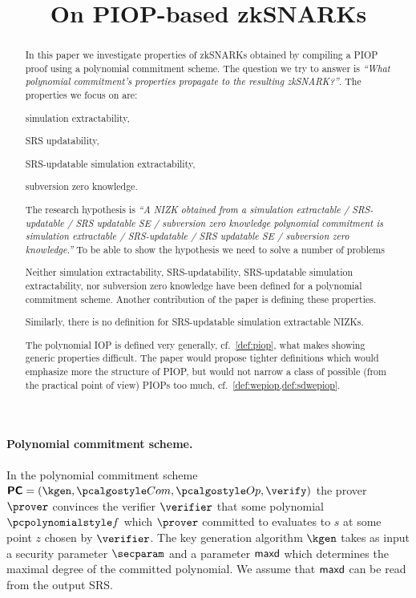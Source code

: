 \documentclass[runningheads,11pt]{llncs}
\title{On PIOP-based zkSNARKs}
\author{}
\institute{}
\newcommand{\say}[1]{\emph{``#1''}}
\begin{document}
 \sloppy \maketitle

\begin{abstract}
  In this paper we investigate properties of zkSNARKs obtained by
  compiling a PIOP proof using a polynomial commitment scheme. The question we
  try to answer is \say{What polynomial commitment's properties propagate to
    the resulting zkSNARK?}. The properties we focus on are:
  \begin{compactenum}
  \item simulation extractability,
  \item SRS updatability,
  \item SRS-updatable simulation extractability,
  \item subversion zero knowledge.
  \end{compactenum}
  The research hypothesis is \say{A NIZK obtained from a simulation extractable /
    SRS-updatable / SRS updatable SE / subversion zero knowledge polynomial
    commitment is simulation extractable /
    SRS-updatable / SRS updatable SE / subversion zero knowledge.} To be able to
  show the hypothesis we need to solve a number of problems
  \begin{compactenum}
  \item Neither simulation extractability, SRS-updatability, SRS-updatable
    simulation extractability, nor subversion zero knowledge have been defined
    for a polynomial commitment scheme. Another contribution of the paper is
    defining these properties. 
  \item Similarly, there is no definition for SRS-updatable simulation
    extractable NIZKs.
  \item The polynomial IOP is defined very generally, cf.~\cref{def:piop}, what
    makes showing generic properties difficult. The paper would propose tighter
    definitions which would emphasize more the structure of PIOP,
    but would not narrow a class of possible (from the practical point of view)
    PIOPs too much, cf.~\cref{def:wepiop,def:sdwepiop}.
  \end{compactenum}
  
\end{abstract}

\paragraph{Polynomial commitment scheme.}
\label{sec:poly_com}
In the polynomial commitment scheme $\PCOM = (\kgen, \com, \open, \verify)$ the
prover $\prover$ convinces the verifier $\verifier$ that some polynomial $\p{f}$
which $\prover$ committed to evaluates to $s$ at some point $z$ chosen by
$\verifier$.  The key generation algorithm $\kgen$ takes as input a security
parameter $\secparam$ and a parameter $\mathsf{maxd}$ which determines the maximal
degree of the committed polynomial. We assume that $\mathsf{maxd}$ can be read from
the output SRS.
  
\end{document}
